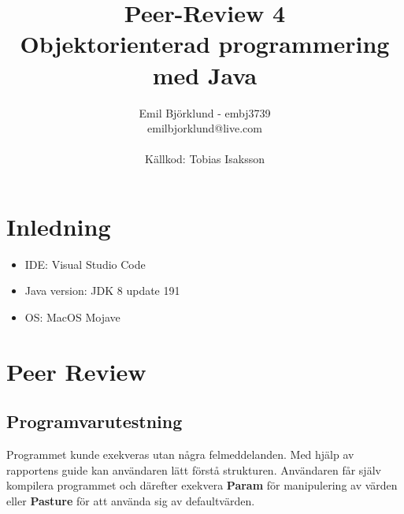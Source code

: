 \documentclass[hidelinks]{article}
\title{Peer-Review 4 \\ Objektorienterad programmering med Java}
\author{Emil Björklund - embj3739 \\ emilbjorklund@live.com \\ \\ Källkod: Tobias Isaksson}
\begin{document}
\maketitle 
\newpage

\section*{Inledning}
\begin {itemize}
\item IDE: Visual Studio Code
\item Java version: JDK 8 update 191
\item OS: MacOS Mojave
\end{itemize}

\section*{Peer Review}
\subsection*{Programvarutestning}
Programmet kunde exekveras utan några felmeddelanden. Med hjälp av rapportens guide kan användaren lätt förstå strukturen.
Användaren får själv kompilera programmet och därefter exekvera \textbf{Param} för manipulering av värden eller \textbf{Pasture} för att använda sig av defaultvärden.
\end{document}
